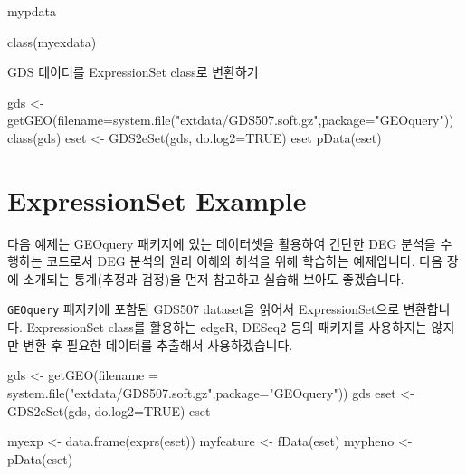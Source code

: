\documentclass[
]{book}
\newenvironment{Shaded}{\begin{snugshade}}{\end{snugshade}}
\newcommand{\AttributeTok}[1]{\textcolor[rgb]{0.77,0.63,0.00}{#1}}
\newcommand{\ConstantTok}[1]{\textcolor[rgb]{0.00,0.00,0.00}{#1}}
\newcommand{\FunctionTok}[1]{\textcolor[rgb]{0.00,0.00,0.00}{#1}}
\newcommand{\NormalTok}[1]{#1}
\newcommand{\OtherTok}[1]{\textcolor[rgb]{0.56,0.35,0.01}{#1}}
\newcommand{\StringTok}[1]{\textcolor[rgb]{0.31,0.60,0.02}{#1}}
\begin{document}
\begin{Shaded}
\begin{Highlighting}[]
\NormalTok{mypdata}

\FunctionTok{class}\NormalTok{(myexdata)}
\end{Highlighting}
\end{Shaded}

GDS 데이터를 ExpressionSet class로 변환하기

\begin{Shaded}
\begin{Highlighting}[]
\NormalTok{gds }\OtherTok{\textless{}{-}} \FunctionTok{getGEO}\NormalTok{(}\AttributeTok{filename=}\FunctionTok{system.file}\NormalTok{(}\StringTok{"extdata/GDS507.soft.gz"}\NormalTok{,}\AttributeTok{package=}\StringTok{"GEOquery"}\NormalTok{))}
\FunctionTok{class}\NormalTok{(gds)}
\NormalTok{eset }\OtherTok{\textless{}{-}} \FunctionTok{GDS2eSet}\NormalTok{(gds, }\AttributeTok{do.log2=}\ConstantTok{TRUE}\NormalTok{)}
\NormalTok{eset}
\FunctionTok{pData}\NormalTok{(eset)}
\end{Highlighting}
\end{Shaded}

\hypertarget{expressionset-example}{%
\section{ExpressionSet Example}\label{expressionset-example}}

다음 예제는 GEOquery 패키지에 있는 데이터셋을 활용하여 간단한 DEG 분석을 수행하는 코드로서 DEG 분석의 원리 이해와 해석을 위해 학습하는 예제입니다. 다음 장에 소개되는 통계(추정과 검정)을 먼저 참고하고 실습해 보아도 좋겠습니다.

\texttt{GEOquery} 패지키에 포함된 GDS507 dataset을 읽어서 ExpressionSet으로 변환합니다. ExpressionSet class를 활용하는 edgeR, DESeq2 등의 패키지를 사용하지는 않지만 변환 후 필요한 데이터를 추출해서 사용하겠습니다.

\begin{Shaded}
\begin{Highlighting}[]
\NormalTok{gds }\OtherTok{\textless{}{-}} \FunctionTok{getGEO}\NormalTok{(}\AttributeTok{filename =} \FunctionTok{system.file}\NormalTok{(}\StringTok{"extdata/GDS507.soft.gz"}\NormalTok{,}\AttributeTok{package=}\StringTok{"GEOquery"}\NormalTok{))}
\NormalTok{gds}
\NormalTok{eset }\OtherTok{\textless{}{-}} \FunctionTok{GDS2eSet}\NormalTok{(gds, }\AttributeTok{do.log2=}\ConstantTok{TRUE}\NormalTok{)}
\NormalTok{eset}

\NormalTok{myexp }\OtherTok{\textless{}{-}} \FunctionTok{data.frame}\NormalTok{(}\FunctionTok{exprs}\NormalTok{(eset))}
\NormalTok{myfeature }\OtherTok{\textless{}{-}} \FunctionTok{fData}\NormalTok{(eset)}
\NormalTok{mypheno }\OtherTok{\textless{}{-}} \FunctionTok{pData}\NormalTok{(eset)}
\end{Highlighting}
\end{Shaded}
\end{document}
